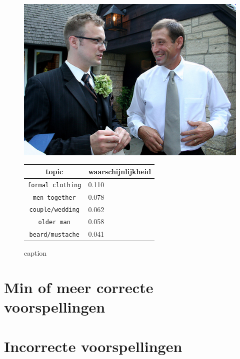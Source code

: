 \begin{figure}[h]
    \centering
    \begin{minipage}[t]{.5\linewidth}
    \centering
    \vspace{0pt}
    \includegraphics[width=\textwidth]{Images/LDA/2773744784.jpg}
    \end{minipage}\hfill
    \begin{minipage}[t]{.5\textwidth}
    \centering
    \vspace{0pt}
    \begin{tabular}{cl}
            topic                           & waarschijnlijkheid\\
            \hline
            \texttt{formal clothing}             & 0.110 \\
            \texttt{men together}                   & 0.078 \\
            \texttt{couple/wedding}                 & 0.062 \\
            \texttt{older man}           & 0.058 \\
            \texttt{beard/mustache}        & 0.041\\
            \hline
        \end{tabular}
    \end{minipage}
    \caption{caption}
    \label{fig:label}
\end{figure}

\section{Min of meer correcte voorspellingen}

\section{Incorrecte voorspellingen}